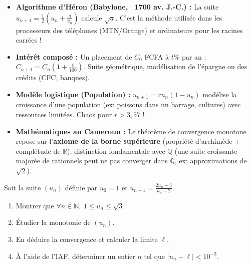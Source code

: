 \documentclass[11pt]{article}
\begin{document}
\begin{savaistu}
\begin{itemize}
  \item \textbf{Algorithme d'Héron (Babylone, ~1700 av. J.-C.) :} La suite $u_{n+1}=\frac{1}{2}(u_n+\frac{a}{u_n})$ calcule $\sqrt{a}$. C'est la méthode utilisée dans les processeurs des téléphones (MTN/Orange) et ordinateurs pour les racines carrées !
  \item \textbf{Intérêt composé :} Un placement de $C_0$ FCFA à $t\%$ par an : $C_{n+1}=C_n(1+\frac{t}{100})$. Suite géométrique, modélisation de l'épargne ou des crédits (CFC, banques).
  \item \textbf{Modèle logistique (Population) :} $u_{n+1}=r u_n(1-u_n)$ modélise la croissance d'une population (ex: poissons dans un barrage, cultures) avec ressources limitées. Chaos pour $r>3,57$ !
  \item \textbf{Mathématiques au Cameroun :} Le théorème de convergence monotone repose sur l'\textbf{axiome de la borne supérieure} (propriété d'archimède + complétude de $\mathbb{R}$), distinction fondamentale avec $\mathbb{Q}$ (une suite croissante majorée de rationnels peut ne pas converger dans $\mathbb{Q}$, ex: approximations de $\sqrt{2}$).
\end{itemize}
\end{savaistu}

\begin{exercice}
Soit la suite $(u_n)$ définie par $u_0=1$ et $u_{n+1}=\frac{2u_n+3}{u_n+2}$.
\begin{enumerate}
  \item Montrer que $\forall n\in\mathbb{N},\ 1\le u_n\le \sqrt{3}$.
  \item Étudier la monotonie de $(u_n)$.
  \item En déduire la convergence et calculer la limite $\ell$.
  \item À l'aide de l'IAF, déterminer un entier $n$ tel que $|u_n-\ell|<10^{-3}$.
\end{enumerate}
\end{exercice}
\end{document}
